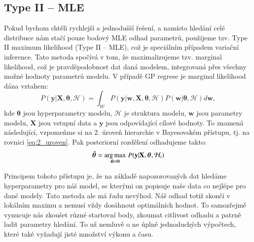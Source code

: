 \subsection{Type II – MLE}
Pokud bychom chtěli rychlejší a jednodušší řešení, a namísto hledání celé distribuce nám stačí pouze bodový MLE odhad parametrů, použijeme tzv. Type II maximum likelihood (Type II – MLE), což je speciálním případem variační inference.
Tato metoda spočívá v tom, že maximalizujeme tzv. marginal likelihood, což je pravděpodobnost dat daná modelem, integrovaná přes všechny možné hodnoty parametrů modelu.
V případě GP regrese je marginal likelihood dána vztahem:
\begin{equation}
  P(\mathbf{y} |\mathbf{X}, \boldsymbol{\theta}, \mathcal{H}) = \int_{\mathcal{W}} P( \mathbf{y} | \mathbf{w}, \mathbf{X}, \boldsymbol{\theta}, \mathcal{H}) P(\mathbf{w} | \boldsymbol{\theta}, \mathcal{H}) d\mathbf{w},
\end{equation}
kde $\boldsymbol{\theta}$ jsou hyperparametry modelu, $\mathcal{H}$ je struktura modelu, $\mathbf{w}$ jsou parametry modelu, $\mathbf{X}$ jsou vstupní data a $\mathbf{y}$ jsou odpovídající cílové hodnoty.
To znamená následující, vzpomeňme si na $2.$ úroveň hierarchie v Bayesovském přístupu, tj. na rovnici \ref{eq:2_uroven}. 
Pak posteriorní rozdělení odhadujeme takto:
\begin{equation}
  \hat{\boldsymbol{\theta}} = \underset{\boldsymbol{\theta} \in \Theta}{\operatorname*{arg\,max}}\; P( \mathbf{y} | \mathbf{X}, \boldsymbol{\theta}, \mathcal{H}_i)
\end{equation}
\par

Principem tohoto přístupu je, že na základě napozorovaných dat hledáme hyperparametry pro náš model, se kterými on popisuje naše data co nejlépe pro dané modely.
Tato metoda ale má řadu nevýhod.
Náš odhad totiž skončí v lokálním maximu a nemusí vždy dosáhnout optimálních hodnot.
To samozřejmě vynucuje nás zkoušet různé startovní body, zkoumat citlivost odhadu a patrně ladit parametry hledání.
To už nemluvě o ne úplně jednoduchých výpočtech, které také vyžadují jisté množství výkonu a času.
\par


